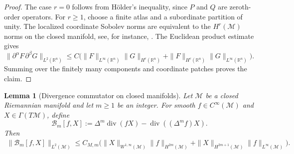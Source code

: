 \documentclass[11pt]{article}
\newtheorem{lemma}[theorem]{Lemma}
\theoremstyle{definition}
\newcommand{\R}{\mathbb{R}}
\newcommand{\divg}{\operatorname{div}}
\begin{document}
\begin{proof}
The case $r=0$ follows from H\"older's inequality, since \(P\) and \(Q\) are
zeroth-order operators.  For $r\ge1$, choose a finite atlas and a subordinate
partition of unity.  The localized coordinate Sobolev norms are equivalent to
the \(H^r(\mathcal{M})\) norms on the closed manifold, see, for instance,
\cite[Chapter~13, Section~1]{taylor2011pde3}.  
The Euclidean product estimate
\cite[Chapter~13, Proposition~3.6]{taylor2011pde3} gives
\[
\|\partial^\alpha F\,\partial^\beta G\|_{L^2(\R^n)}
\le
C
\bigl(
\|F\|_{L^\infty(\R^n)}\|G\|_{H^r(\R^n)}
+
\|F\|_{H^r(\R^n)}\|G\|_{L^\infty(\R^n)}
\bigr).
\]
Summing over the finitely many components and coordinate patches proves the claim.
\end{proof}

\begin{lemma}[Divergence commutator on closed manifolds]\label{lem:integer_commutators}
Let $\mathcal{M}$ be a closed  Riemannian manifold and let $m\ge1$ be an integer.  For smooth
$f\in C^\infty(\mathcal{M})$ and $X\in \Gamma(T\mathcal{M})$, define
\[
\mathcal B_m[f,X]
:=
\Delta^m\divg(fX)-\divg((\Delta^m f)X).
\]
Then
\[
\begin{aligned}
\|\mathcal B_m[f,X]\|_{L^2(\mathcal{M})}
\le
C_{M,m}
\bigl(
\|X\|_{W^{1,\infty}(\mathcal{M})}\|f\|_{H^{2m}(\mathcal{M})}
+
\|X\|_{H^{2m+1}(\mathcal{M})}\|f\|_{L^\infty(\mathcal{M})}
\bigr).
\end{aligned}
\]
\end{lemma}
\end{document}
